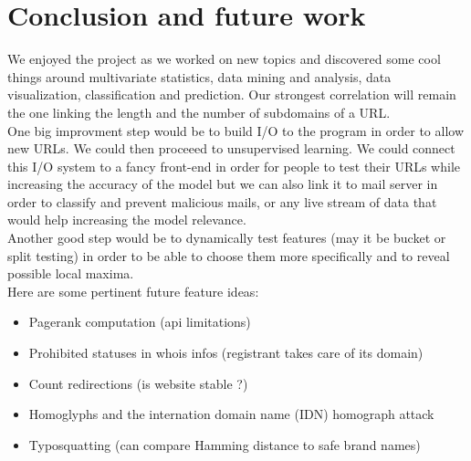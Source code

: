 \documentclass[conference,11pt]{IEEEtran}
\begin{document}
\section{Conclusion and future work}
We enjoyed the project as we worked on new topics and discovered some cool
things around multivariate statistics, data mining and analysis, data
visualization, classification and prediction. Our strongest correlation will
remain the one linking the length and the number of subdomains of a URL. \\
One big improvment step would be to build I/O to the program in order to allow
new URLs. We could then proceeed to unsupervised learning. We could connect this
I/O system to a fancy front-end in order for people to test their URLs while
increasing the accuracy of the model but we can also link it to mail server in
order to classify and prevent malicious mails, or any live stream of data that
would help increasing the model relevance. \\
Another good step would be to dynamically test features (may it be bucket or
split testing) in order to be able to choose them more specifically and to
reveal possible local maxima. \\

Here are some pertinent future feature ideas:
\begin{itemize}
  \item Pagerank computation (api limitations)
  \item Prohibited statuses in whois infos (registrant takes care of its domain)
  \item Count redirections (is website stable ?)
  \item Homoglyphs and the internation domain name (IDN) homograph attack
  \item Typosquatting (can compare Hamming distance to safe brand names)
\end{itemize}



\end{document}
